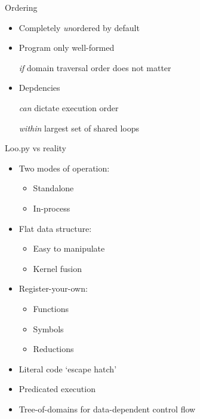 \documentclass[english,compress]{beamer}
\begin{document}
\begin{frame}{Ordering}
  \begin{itemize}
    \item Completely \emph{un}ordered by default
    \item Program only well-formed

      \emph{if} domain traversal order does not matter
    \item Depdencies

      \emph{can} dictate execution order

      \emph{within} largest set of shared loops
  \end{itemize}
\end{frame}
\begin{frame}{Loo.py vs reality}
  \begin{itemize}
    \item
    Two modes of operation:
    \begin{itemize}
      \item Standalone
      \item In-process
    \end{itemize}
    \item Flat data structure:
      \begin{itemize}
        \item Easy to manipulate
        \item Kernel fusion
      \end{itemize}
    \item Register-your-own:
      \begin{itemize}
        \item Functions
        \item Symbols
        \item Reductions
      \end{itemize}
    \item Literal code `escape hatch'
    \item Predicated execution
    \item Tree-of-domains for data-dependent control flow
  \end{itemize}
\end{frame}
\end{document}
